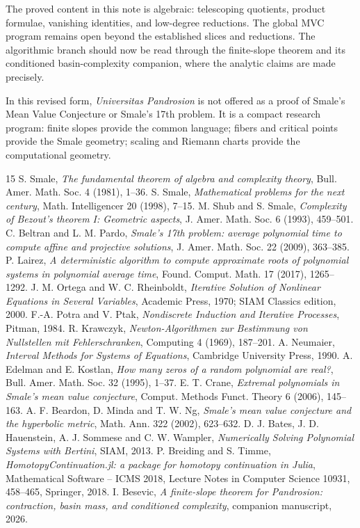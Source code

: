 \documentclass[11pt,a4paper]{article}
\theoremstyle{soft}
\theoremstyle{definition}
\begin{document}
The proved content in this note is algebraic: telescoping quotients, product formulae, vanishing identities, and low-degree reductions.  The global MVC program remains open beyond the established slices and reductions.  The algorithmic branch should now be read through the finite-slope theorem and its conditioned basin-complexity companion, where the analytic claims are made precisely.

In this revised form, \emph{Universitas Pandrosion} is not offered as a proof of Smale's Mean Value Conjecture or Smale's 17th problem.  It is a compact research program: finite slopes provide the common language; fibers and critical points provide the Smale geometry; scaling and Riemann charts provide the computational geometry.

\begin{thebibliography}{15}
 S. Smale, \emph{The fundamental theorem of algebra and complexity theory}, Bull. Amer. Math. Soc. 4 (1981), 1--36.
 S. Smale, \emph{Mathematical problems for the next century}, Math. Intelligencer 20 (1998), 7--15.
 M. Shub and S. Smale, \emph{Complexity of Bezout's theorem I: Geometric aspects}, J. Amer. Math. Soc. 6 (1993), 459--501.
 C. Beltran and L. M. Pardo, \emph{Smale's 17th problem: average polynomial time to compute affine and projective solutions}, J. Amer. Math. Soc. 22 (2009), 363--385.
 P. Lairez, \emph{A deterministic algorithm to compute approximate roots of polynomial systems in polynomial average time}, Found. Comput. Math. 17 (2017), 1265--1292.
 J. M. Ortega and W. C. Rheinboldt, \emph{Iterative Solution of Nonlinear Equations in Several Variables}, Academic Press, 1970; SIAM Classics edition, 2000.
 F.-A. Potra and V. Ptak, \emph{Nondiscrete Induction and Iterative Processes}, Pitman, 1984.
 R. Krawczyk, \emph{Newton-Algorithmen zur Bestimmung von Nullstellen mit Fehlerschranken}, Computing 4 (1969), 187--201.
 A. Neumaier, \emph{Interval Methods for Systems of Equations}, Cambridge University Press, 1990.
 A. Edelman and E. Kostlan, \emph{How many zeros of a random polynomial are real?}, Bull. Amer. Math. Soc. 32 (1995), 1--37.
 E. T. Crane, \emph{Extremal polynomials in Smale's mean value conjecture}, Comput. Methods Funct. Theory 6 (2006), 145--163.
 A. F. Beardon, D. Minda and T. W. Ng, \emph{Smale's mean value conjecture and the hyperbolic metric}, Math. Ann. 322 (2002), 623--632.
 D. J. Bates, J. D. Hauenstein, A. J. Sommese and C. W. Wampler, \emph{Numerically Solving Polynomial Systems with Bertini}, SIAM, 2013.
 P. Breiding and S. Timme, \emph{HomotopyContinuation.jl: a package for homotopy continuation in Julia}, Mathematical Software -- ICMS 2018, Lecture Notes in Computer Science 10931, 458--465, Springer, 2018.
 I. Besevic, \emph{A finite-slope theorem for Pandrosion: contraction, basin mass, and conditioned complexity}, companion manuscript, 2026.
\end{thebibliography}
\end{document}
